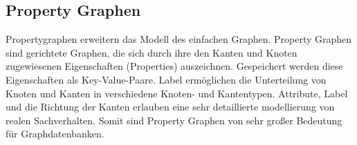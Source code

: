 %
\subsection{Property Graphen}
Propertygraphen erweitern das Modell des einfachen Graphen.
Property Graphen sind gerichtete Graphen, die sich durch ihre den Kanten und Knoten zugewiesenen Eigenschaften (Properties) auszeichnen.
Gespeichert werden diese Eigenschaften als Key-Value-Paare.
Label ermöglichen die Unterteilung von Knoten und Kanten in verschiedene Knoten- und Kantentypen.
Attribute, Label und die Richtung der Kanten erlauben eine sehr detaillierte modellierung von realen Sachverhalten.
Somit sind Property Graphen von sehr großer Bedeutung für Graphdatenbanken.

